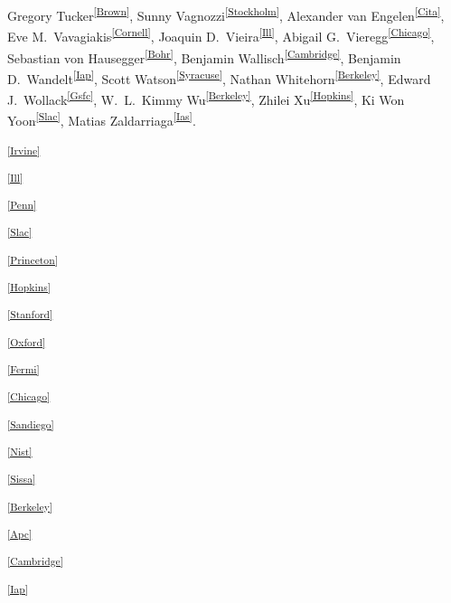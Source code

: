 Gregory Tucker\textsuperscript{\ref{Brown}},
Sunny Vagnozzi\textsuperscript{\ref{Stockholm}},
Alexander van Engelen\textsuperscript{\ref{Cita}},
Eve M.~Vavagiakis\textsuperscript{\ref{Cornell}},
Joaquin D.~Vieira\textsuperscript{\ref{Ill}},
Abigail G.~Vieregg\textsuperscript{\ref{Chicago}}, 
Sebastian von Hausegger\textsuperscript{\ref{Bohr}},
Benjamin Wallisch\textsuperscript{\ref{Cambridge}},
Benjamin D.~Wandelt\textsuperscript{\ref{Iap}},
Scott Watson\textsuperscript{\ref{Syracuse}},
Nathan Whitehorn\textsuperscript{\ref{Berkeley}},
Edward J.~Wollack\textsuperscript{\ref{Gsfc}},
W.~L.~Kimmy Wu\textsuperscript{\ref{Berkeley}},
Zhilei Xu\textsuperscript{\ref{Hopkins}},
Ki Won Yoon\textsuperscript{\ref{Slac}},
Matias Zaldarriaga\textsuperscript{\ref{Ias}}.

\clearpage

\begin{multicols}{2}

\scriptsize

\parskip=4pt

\noindent
\textsuperscript{\ref{Irvine}}\Irvinetext

\noindent
\textsuperscript{\ref{Ill}}\Illtext

\noindent
\textsuperscript{\ref{Penn}}\Penntext

\noindent
\textsuperscript{\ref{Slac}}\Slactext

\noindent
\textsuperscript{\ref{Princeton}}\Princetontext

\noindent
\textsuperscript{\ref{Hopkins}}\Hopkinstext

\noindent
\textsuperscript{\ref{Stanford}}\Stanfordtext

\noindent
\textsuperscript{\ref{Oxford}}\Oxfordtext

\noindent
\textsuperscript{\ref{Fermi}}\Fermitext

\noindent
\textsuperscript{\ref{Chicago}}\Chicagotext

\noindent
\textsuperscript{\ref{Sandiego}}\Sandiegotext

\noindent
\textsuperscript{\ref{Nist}}\Nisttext

\noindent
\textsuperscript{\ref{Sissa}}\Sissatext

\noindent
\textsuperscript{\ref{Berkeley}}\Berkeleytext

\noindent
\textsuperscript{\ref{Apc}}\Apctext

\noindent
\textsuperscript{\ref{Cambridge}}\Cambridgetext

\noindent
\textsuperscript{\ref{Iap}}\Iaptext


\end{multicols}
